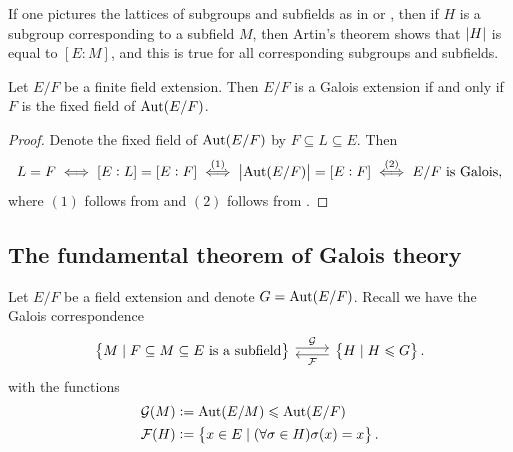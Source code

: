 \documentclass[11pt,a4paper]{article}
\begin{document}
\begin{remark}
  If one pictures the lattices of subgroups and subfields as in
  or ,
  then if $H$ is a subgroup corresponding to a subfield $M$,
  then Artin's theorem shows that $\left\lvert H\right\rvert$
  is equal to $[E : M]$,
  and this is true for all corresponding subgroups and subfields.
\end{remark}

\begin{corollary}
  Let $E/F$ be a finite field extension.
  Then $E/F$ is a Galois extension if and only if $F$ is
  the fixed field of $\operatorname{Aut}(E/F)$.
\end{corollary}
\begin{proof}
  Denote the fixed field of $\operatorname{Aut}(E/F)$ by $F \subseteq L \subseteq E$.
  Then
  \[
    L = F \iff
    [E : L] = [E : F] \overset{(1)}{\iff}
    \left\lvert\operatorname{Aut}(E/F)\right\rvert = [E : F] \overset{(2)}{\iff}
    E/F \text{ is Galois},
  \]
  where $(1)$ follows from  and $(2)$
  follows from .
\end{proof}

\subsection{The fundamental theorem of Galois theory}

\begin{remark}
  Let $E/F$ be a field extension and denote $G = \operatorname{Aut}(E/F)$.
  Recall we have the Galois correspondence
  \[
  \begin{tikzcd}
    \set{M \mid F \subseteq M \subseteq E \text{ is a subfield}}
    \arrow[r, shift left, "\GG"] &
    \set{H \mid H \leqslant G}
    \arrow[l, shift left, "\FF"].
  \end{tikzcd}
  \]
  with the functions
  \begin{align*}
    &\mathcal G(M) := \operatorname{Aut}(E/M) \leqslant \operatorname{Aut}(E/F) \\
    &\mathcal F(H) := \left\{x \in E \mid (\forall \sigma \in H) \sigma(x) = x\right\}.
  \end{align*}
\end{remark}
\end{document}
